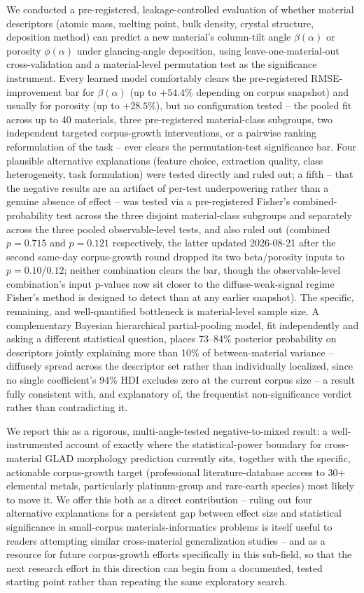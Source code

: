 \documentclass[aip,amsmath,amssymb,reprint]{revtex4-1}
\begin{document}
We conducted a pre-registered, leakage-controlled evaluation of
whether material descriptors (atomic mass, melting point, bulk
density, crystal structure, deposition method) can predict a new
material's column-tilt angle $\beta(\alpha)$ or porosity $\phi(\alpha)$
under glancing-angle deposition, using leave-one-material-out
cross-validation and a material-level permutation test as the
significance instrument. Every learned model comfortably clears the
pre-registered RMSE-improvement bar for $\beta(\alpha)$ (up to
$+54.4\%$ depending on corpus snapshot) and usually for porosity (up
to $+28.5\%$), but no configuration tested -- the pooled fit across up
to 40 materials, three pre-registered material-class subgroups, two
independent targeted corpus-growth interventions, or a pairwise
ranking reformulation of the task -- ever clears the permutation-test
significance bar. Four plausible alternative explanations (feature
choice, extraction quality, class heterogeneity, task formulation)
were tested directly and ruled out; a fifth -- that the negative
results are an artifact of per-test underpowering rather than a
genuine absence of effect -- was tested via a pre-registered Fisher's
combined-probability test across the three disjoint material-class
subgroups and separately across the three pooled observable-level
tests, and also ruled out (combined $p=0.715$ and $p=0.121$
respectively, the latter updated 2026-08-21 after the second same-day
corpus-growth round dropped its two beta/porosity inputs to
$p=0.10$/$0.12$; neither combination clears the bar, though the
observable-level combination's input p-values now sit closer to the
diffuse-weak-signal regime Fisher's method is designed to detect than
at any earlier snapshot). The specific, remaining, and
well-quantified bottleneck is material-level sample size. A
complementary Bayesian hierarchical partial-pooling model, fit
independently and asking a different statistical question, places
73--84\% posterior
probability on descriptors jointly explaining more than 10\% of
between-material variance -- diffusely spread across the descriptor
set rather than individually localized, since no single coefficient's
94\% HDI excludes zero at the current corpus size -- a result fully
consistent with, and explanatory of, the frequentist non-significance
verdict rather than contradicting it.

We report this as a rigorous, multi-angle-tested negative-to-mixed
result: a well-instrumented account of exactly where the
statistical-power boundary for cross-material GLAD morphology
prediction currently sits, together with the specific, actionable
corpus-growth target (professional literature-database access to
30+ elemental metals, particularly platinum-group and rare-earth
species) most likely to move it. We offer this both as a direct
contribution -- ruling out four alternative explanations for a
persistent gap between effect size and statistical significance in
small-corpus materials-informatics problems is itself useful to
readers attempting similar cross-material generalization studies --
and as a resource for future corpus-growth efforts specifically in
this sub-field, so that the next research effort in this direction can
begin from a documented, tested starting point rather than repeating
the same exploratory search.
\end{document}
